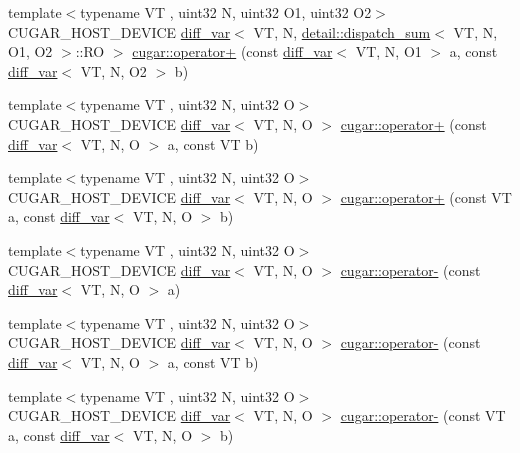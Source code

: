 \begin{DoxyCompactItemize}
\item 
{\footnotesize template$<$typename VT , uint32 N, uint32 O1, uint32 O2$>$ }\\C\+U\+G\+A\+R\+\_\+\+H\+O\+S\+T\+\_\+\+D\+E\+V\+I\+CE \hyperlink{structcugar_1_1diff__var}{diff\+\_\+var}$<$ VT, N, \hyperlink{structcugar_1_1detail_1_1dispatch__sum}{detail\+::dispatch\+\_\+sum}$<$ VT, N, O1, O2 $>$\+::RO $>$ \hyperlink{group___auto_diff_module_ga47d435fca613a46396a9d551d12b7f16}{cugar\+::operator+} (const \hyperlink{structcugar_1_1diff__var}{diff\+\_\+var}$<$ VT, N, O1 $>$ a, const \hyperlink{structcugar_1_1diff__var}{diff\+\_\+var}$<$ VT, N, O2 $>$ b)
\item 
{\footnotesize template$<$typename VT , uint32 N, uint32 O$>$ }\\C\+U\+G\+A\+R\+\_\+\+H\+O\+S\+T\+\_\+\+D\+E\+V\+I\+CE \hyperlink{structcugar_1_1diff__var}{diff\+\_\+var}$<$ VT, N, O $>$ \hyperlink{group___auto_diff_module_gac73e44f611bc7ebbcf9d2e3492b81976}{cugar\+::operator+} (const \hyperlink{structcugar_1_1diff__var}{diff\+\_\+var}$<$ VT, N, O $>$ a, const VT b)
\item 
{\footnotesize template$<$typename VT , uint32 N, uint32 O$>$ }\\C\+U\+G\+A\+R\+\_\+\+H\+O\+S\+T\+\_\+\+D\+E\+V\+I\+CE \hyperlink{structcugar_1_1diff__var}{diff\+\_\+var}$<$ VT, N, O $>$ \hyperlink{group___auto_diff_module_gafde6513cdae3834b1bd130607df39356}{cugar\+::operator+} (const VT a, const \hyperlink{structcugar_1_1diff__var}{diff\+\_\+var}$<$ VT, N, O $>$ b)
\item 
{\footnotesize template$<$typename VT , uint32 N, uint32 O$>$ }\\C\+U\+G\+A\+R\+\_\+\+H\+O\+S\+T\+\_\+\+D\+E\+V\+I\+CE \hyperlink{structcugar_1_1diff__var}{diff\+\_\+var}$<$ VT, N, O $>$ \hyperlink{group___auto_diff_module_ga9f04070233d92db57d6d4287daf01702}{cugar\+::operator-\/} (const \hyperlink{structcugar_1_1diff__var}{diff\+\_\+var}$<$ VT, N, O $>$ a)
\item 
{\footnotesize template$<$typename VT , uint32 N, uint32 O$>$ }\\C\+U\+G\+A\+R\+\_\+\+H\+O\+S\+T\+\_\+\+D\+E\+V\+I\+CE \hyperlink{structcugar_1_1diff__var}{diff\+\_\+var}$<$ VT, N, O $>$ \hyperlink{group___auto_diff_module_ga6052727ad3520694d4a37db71532423c}{cugar\+::operator-\/} (const \hyperlink{structcugar_1_1diff__var}{diff\+\_\+var}$<$ VT, N, O $>$ a, const VT b)
\item 
{\footnotesize template$<$typename VT , uint32 N, uint32 O$>$ }\\C\+U\+G\+A\+R\+\_\+\+H\+O\+S\+T\+\_\+\+D\+E\+V\+I\+CE \hyperlink{structcugar_1_1diff__var}{diff\+\_\+var}$<$ VT, N, O $>$ \hyperlink{group___auto_diff_module_ga57d83c9449b450f1a1b3d655bb92ef24}{cugar\+::operator-\/} (const VT a, const \hyperlink{structcugar_1_1diff__var}{diff\+\_\+var}$<$ VT, N, O $>$ b)

\end{DoxyCompactItemize}
